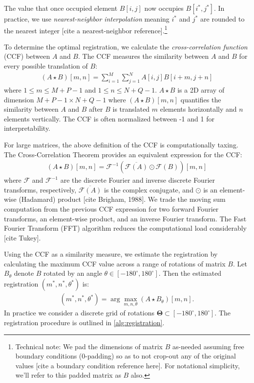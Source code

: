 \documentclass[
]{jdssv}
\begin{document}
The value that once occupied element \(B[i,j]\) now occupies
\(B[i^*,j^*]\). In practice, we use \emph{nearest-neighbor
interpolation} meaning \(i^*\) and \(j^*\) are rounded to the nearest
integer {[}cite a nearest-neighbor
reference{]}.\footnote{Technical note: We pad the dimensions of matrix $B$ as-needed assuming free boundary conditions (0-padding) so as to not crop-out any of the original values [cite a boundary condition reference here]. For notational simplicity, we'll refer to this padded matrix as $B$ also.}

To determine the optimal registration, we calculate the
\emph{cross-correlation function} (CCF) between \(A\) and \(B\). The CCF
measures the similarity between \(A\) and \(B\) for every possible
translation of \(B\): \begin{align*}
(A \star B)[m,n] = \sum_{i=1}^M \sum_{j=1}^N A[i,j] B[i + m, j + n]
\end{align*} where \(1 \leq m \leq M + P - 1\) and
\(1 \leq n \leq N + Q - 1\). \(A \star B\) is a 2D array of dimension
\(M + P - 1 \times N + Q - 1\) where \((A \star B)[m,n]\) quantifies the
similarity between \(A\) and \(B\) after \(B\) is translated \(m\)
elements horizontally and \(n\) elements vertically. The CCF is often
normalized between -1 and 1 for interpretability.

For large matrices, the above definition of the CCF is computationally
taxing. The Cross-Correlation Theorem provides an equivalent expression
for the CCF: \begin{align*}
(A \star B)[m,n] = \mathcal{F}^{-1}\left(\overline{\mathcal{F}(A)} \odot \mathcal{F}(B)\right)[m,n]
\end{align*} where \(\mathcal{F}\) and \(\mathcal{F}^{-1}\) are the
discrete Fourier and inverse discrete Fourier transforms, respectively,
\(\overline{\mathcal{F}(A)}\) is the complex conjugate, and \(\odot\) is
an element-wise (Hadamard) product {[}cite Brigham, 1988{]}. We trade
the moving sum computation from the previous CCF expression for two
forward Fourier transforms, an element-wise product, and an inverse
Fourier transform. The Fast Fourier Transform (FFT) algorithm reduces
the computational load considerably {[}cite Tukey{]}.

Using the CCF as a similarity measure, we estimate the registration by
calculating the maximum CCF value across a range of rotations of matrix
\(B\). Let \(B_\theta\) denote \(B\) rotated by an angle
\(\theta \in [-180^\circ,180^\circ]\). Then the estimated registration
\((m^*,n^*,\theta^*)\) is: \begin{align*}
(m^*,n^*,\theta^*) = \arg \max_{m,n,\theta} (A \star B_\theta)[m,n].
\end{align*} In practice we consider a discrete grid of rotations
\(\pmb{\Theta} \subset [-180^\circ,180^\circ]\). The registration
procedure is outlined in \autoref{alg:registration}.
\end{document}
